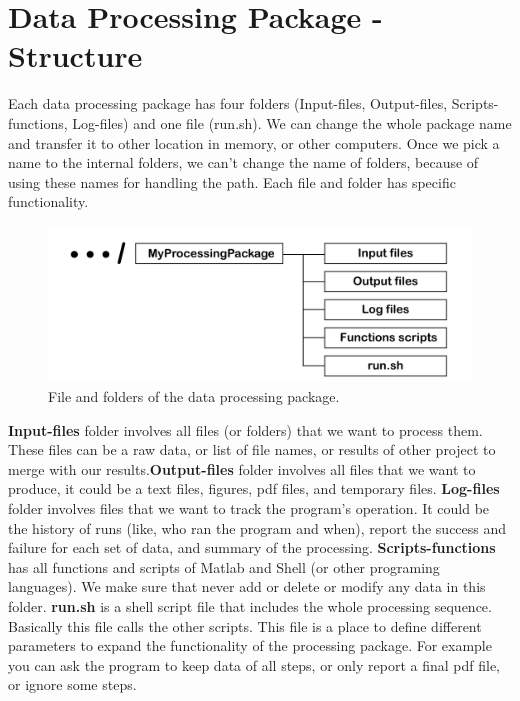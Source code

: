 \section{Data Processing Package - Structure}

Each data processing package has four folders (Input-files, Output-files, Scripts-functions, Log-files) and one file (run.sh). We can change the whole package name and transfer it to other location in memory, or other computers. Once we pick a name to the internal folders, we can't change the name of folders, because of using these names for handling the path. Each file and folder has specific functionality.

\begin{figure} [ht]
\centering
\includegraphics[scale=0.6]{figures/pdf/Figure02.pdf} 
\caption{File and folders of the data processing package.}
\label{fig:structure}
\end{figure}


\textbf{Input-files} folder involves all files (or folders) that we want to process them. These files can be a raw data, or list of file names, or results of other project to merge with our results.\textbf{Output-files} folder involves all files that we want to produce, it could be a text files, figures, pdf files, and temporary files. \textbf{Log-files} folder involves files that we want to track the program's operation. It could be the history of runs (like, who ran the program and when), report the success and failure for each set of data, and summary of the processing.  \textbf{Scripts-functions} has all functions and scripts of Matlab and Shell (or other programing languages). We make sure that never add or delete or modify any data in this folder. \textbf{run.sh} is a shell script file that includes the whole processing sequence. Basically this file calls the other scripts. This file is a place to define different parameters to expand the functionality of the processing package. For example you can ask the program to keep data of all steps, or only report a final pdf file, or ignore some steps. 


